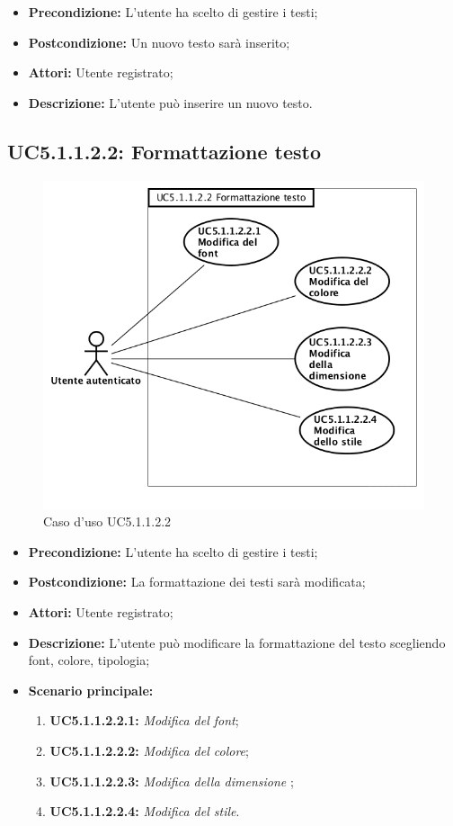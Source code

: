\begin{itemize}
	\item \textbf{Precondizione:} L'utente ha scelto di gestire i testi;
	\item \textbf{Postcondizione:} Un nuovo testo sarà inserito;
	\item \textbf{Attori:} Utente registrato;
	\item \textbf{Descrizione:} L'utente può inserire un nuovo testo.
\end{itemize}

\newpage
\subsection{ UC5.1.1.2.2: Formattazione testo}

\begin{figure}[h]
	\begin{center}
	\includegraphics[scale=0.6]{diagram/UC5-1-1-2-2.png}
	\caption{Caso d'uso UC5.1.1.2.2}
	\end{center}
\end{figure}
\begin{itemize}
	\item \textbf{Precondizione:} L'utente ha scelto di gestire i testi;
	\item \textbf{Postcondizione:} La formattazione dei testi sarà modificata;
	\item \textbf{Attori:} Utente registrato;
	\item \textbf{Descrizione:} L'utente può modificare la formattazione del testo scegliendo font, colore, tipologia;
	\item \textbf{Scenario principale:}
	\begin{enumerate}
		\item \textbf{ UC5.1.1.2.2.1:} \textit{ Modifica del font};
		\item \textbf{ UC5.1.1.2.2.2:} \textit{ Modifica del colore};
		\item \textbf{ UC5.1.1.2.2.3:} \textit{ Modifica della dimensione };
		\item \textbf{ UC5.1.1.2.2.4:} \textit{ Modifica del stile}.
	\end{enumerate}
\end{itemize}
